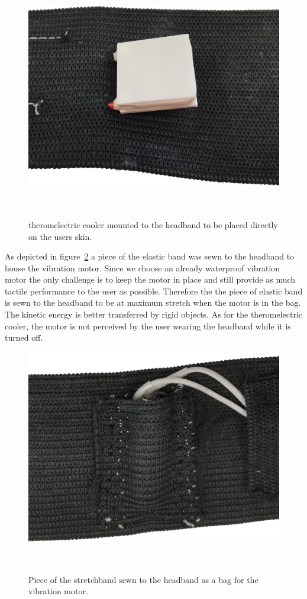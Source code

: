 \begin{figure}
	\includegraphics[width= \textwidth]{images/peltier.png}
	\caption{theromelectric cooler mounted to the headband to be placed directly on the users skin.}~\label{fig:peltier}
\end{figure}

As depicted in figure~\ref{fig:headbandmotorbag} a piece of the elastic band was sewn to the headband to house the vibration motor.
Since we choose an already waterproof vibration motor the only challenge is to keep the motor in place and still provide as much tactile performance to the user as possible.
Therefore the the piece of elastic band is sewn to the headband to be at maximum stretch when the motor is in the bag.
The kinetic energy is better transferred by rigid objects.
As for the theromelectric cooler, the motor is not perceived by the user wearing the headband while it is turned off.

\begin{figure}
	\includegraphics[width= \textwidth]{images/headbandmotorbag.png}
	\caption{Piece of the stretchband sewn to the headband as a bag for the vibration motor.}~\label{fig:headbandmotorbag}
\end{figure}

